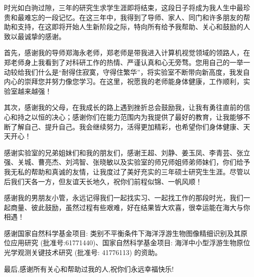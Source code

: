 \begin{acknowledgement}
时光如白驹过隙，三年的研究生求学生涯即将结束，这段日子将成为我人生中最珍贵和最难忘的一段记忆。在这三年中，我得到了导师、家人、同门和许多朋友的帮助和支持，在这即将开始人生新阶段之际，特向所有给予我帮助、关心和鼓励的人致以最诚挚的感谢。

首先，感谢我的导师郑海永老师，郑老师是带我进入计算机视觉领域的领路人，在郑老师身上我看到了对科研工作的热情、严谨认真和心无旁骛。您用自己的一举一动较给我们什么是“耐得住寂寞，守得住繁华”，将实验室不断带向新高度，我发自内心的崇拜您并努力像您学习。在这里，祝愿我的老师能身体健康，工作顺利，实验室越来越强！

其次，感谢我的父母，在我成长的路上遇到挫折总会鼓励我，让我有勇往直前的信心和持之以恒的决心；感谢你们在能力范围内为我提供了最好的教育，让我能够不断了解自己、提升自己。我会继续努力，活得更加精彩，也希望你们身体健康、天天开心！

感谢实验室的兄弟姐妹们和我的朋友们，感谢王超、刘静、姜玉凤、李青芸、张立强、关城、曹亮杰、刘鸿智、张晓敏以及实验室的师兄师姐师弟师妹们，你们给予我无私的帮助和真诚的友情，让我度过了美好充实的三年硕士研究生生涯。尽管以后我们天各一方，但友谊天长地久，祝你们前程似锦、一帆风顺！

感谢我的男朋友小管，永远记得我们一起找实习、一起找工作的那段时光，我们一起商量、彼此鼓励，虽然过程有些艰难，好在结果皆大欢喜，很幸运能在海大与你相遇！

感谢国家自然科学基金项目: 类别不平衡条件下海洋浮游生物图像精细识别及其原位应用研究 (批准号:61771440)、国家自然科学基金项目: 海洋中小型浮游生物原位光学观测关键技术研究 (批准号: 41776113) 的资助。

最后,感谢所有关心和帮助过我的人,祝你们永远幸福快乐!

\end{acknowledgement}

